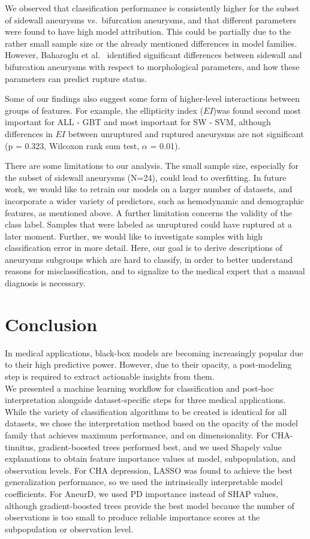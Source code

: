 \documentclass[
  oneside]{book}
\begin{document}
We observed that classification performance is consistently higher for the subset of sidewall aneurysms vs.~bifurcation aneurysms, and that different parameters were found to have high model attribution.
This could be partially due to the rather small sample size or the already mentioned differences in model families.
However, Baharoglu et al.~\autocite{BaharogluEtAl:Neurosurgery2012} identified significant differences between sidewall and bifurcation aneurysms with respect to morphological parameters, and how these parameters can predict rupture status.

Some of our findings also suggest some form of higher-level interactions between groups of features.
For example, the ellipticity index (\(EI\))was found second most important for ALL - GBT and most important for SW - SVM, although differences in \(EI\) between unruptured and ruptured aneurysms are not significant (p = 0.323, Wilcoxon rank sum test, \(\alpha\) = 0.01).

There are some limitations to our analysis.
The small sample size, especially for the subset of sidewall aneurysms (N=24), could lead to overfitting.
In future work, we would like to retrain our models on a larger number of datasets, and incorporate a wider variety of predictors, such as hemodynamic and demographic features, as mentioned above.
A further limitation concerns the validity of the class label.
Samples that were labeled as unruptured could have ruptured at a later moment.
Further, we would like to investigate samples with high classification error in more detail.
Here, our goal is to derive descriptions of aneurysms subgroups which are hard to classify, in order to better understand reasons for misclassification, and to signalize to the medical expert that a manual diagnosis is necessary.

\hypertarget{iml-conclusion}{%
\section{Conclusion}\label{iml-conclusion}}

In medical applications, black-box models are becoming increasingly popular due to their high predictive power.
However, due to their opacity, a post-modeling step is required to extract actionable insights from them.\\
We presented a machine learning workflow for classification and post-hoc interpretation alongside dataset-specific steps for three medical applications.
While the variety of classification algorithms to be created is identical for all datasets, we chose the interpretation method based on the opacity of the model family that achieves maximum performance, and on dimensionality.
For CHA-tinnitus, gradient-boosted trees performed best, and we used Shapely value explanations to obtain feature importance values at model, subpopulation, and observation levels.
For CHA depression, LASSO was found to achieve the best generalization performance, so we used the intrinsically interpretable model coefficients.
For AneurD, we used PD importance instead of SHAP values, although gradient-boosted trees provide the best model because the number of observations is too small to produce reliable importance scores at the subpopulation or observation level.
\end{document}
